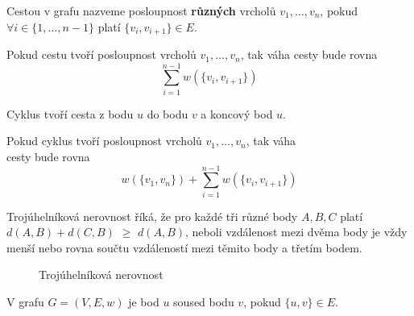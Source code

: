 \begin{definition}[Cesta]
    \label{definice:cesta}
    Cestou v grafu nazveme posloupnost \textbf{různých} vrcholů $v_1, \dots, v_n$, pokud $\forall i \in \{1,\dots, n-1\}$ platí $\{v_i, v_{i+1}\} \in E$.  
\end{definition}

\begin{definition}
    \label{definice:vaha_cesty}
    Pokud cestu tvoří posloupnost vrcholů $v_1, \dots, v_n$, tak váha cesty bude rovna \[ \sum_{i=1}^{n-1}w(\{v_i, v_{i+1}\}) \]
    
\end{definition}

\begin{definition}[Cyklus]
    \label{definice:cyklus}
    Cyklus tvoří cesta z bodu $u$ do bodu $v$ a koncový bod $u$.    
\end{definition}

\begin{definition}
    \label{definice:vaha_cyklu}
    Pokud cyklus tvoří posloupnost vrcholů $v_1, \dots, v_n$, tak váha \\cesty bude rovna \[ w(\{v_1, v_n\}) + \sum_{i=1}^{n-1}w(\{v_i, v_{i+1}\}) \]
    
\end{definition}

\begin{definition}
    \label{definice:trojuhelnikova_nerovnost}
    Trojúhelníková nerovnost říká, že pro každé tři různé body $A, B, C$ platí \textcolor{myblue}{$d(A, B)+d(C, B)$} $\geq$ \textcolor{myred}{$d(A,B)$}, neboli vzdálenost mezi dvěma body je vždy menší nebo rovna součtu vzdáleností mezi těmito body a třetím bodem. 

    \begin{figure}[h]
        \centering
        \caption{Trojúhelníková nerovnost}
    \end{figure}

    \begin{definition}[Soused]
        \label{definice:soused}
        V grafu $G = (V, E, w)$ je bod $u$ soused bodu $v$, pokud $\{u, v\} \in E$.
    \end{definition}
    
\end{definition}